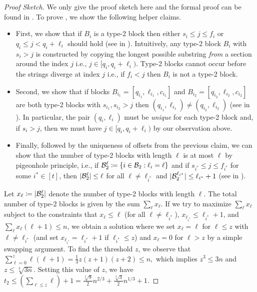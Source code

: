 \begin{proof}[Proof Sketch]
We only give the proof sketch here and the formal proof can be found in . To prove , we show the following helper claims. 
\begin{itemize}
    \item First, we show that if $B_i$ is a type-2 block then either $s_i\leq j\leq f_i$ or $q_i\leq j<q_i+\ell_i$ should hold (see  in ). Intuitively, any type-2 block $B_i$ with $s_i > j$ is constructed by copying the longest possible substring \emph{from} a section around the index $j$ i.e., $j \in [q_i, q_i+\ell_i)$. Type-2 blocks cannot occur before the strings diverge at index $j$ i.e., if $f_i < j$ then $B_i$ is not a type-2 block.
    \item Second, we show that if blocks $B_{i_1} = [q_{i_1}, \ell_{i_1}, c_{i_1}]$ and $B_{i_2}= [q_{i_2}, \ell_{i_2}, c_{i_2}]$ are both type-2 blocks with $s_{i_1}, s_{i_2} > j$ then $(q_{i_1},\ell_{i_1})\neq(q_{i_2},\ell_{i_2})$ (see  in ).  In particular, the pair $(q_i,\ell_i)$ must be {\em unique} for each type-2 block and, if $s_i > j$, then we must have $j \in [q_i, q_i+\ell_i)$ by our observation above.
    
    \item Finally, followed by the uniqueness of offsets from the previous claim, we can show that the number of type-2 blocks with length $\ell$ is at most $\ell$ by pigeonhole principle, i.e., if ${\mathcal{B}}_2^\ell\coloneqq\{i\in{\ensuremath{\mathcal{B}}}_2:\ell_i=\ell\}$ and if $s_{i^*}\leq j\leq f_{i^*}$ for some $i^*\in[t]$, then $|{\mathcal{B}}_2^\ell|\leq\ell$ for all $\ell\neq\ell_{i^*}$ and $|{\mathcal{B}}_2^{\ell_{i^*}}|\leq\ell_{i^*}+1$ (see  in ).
\end{itemize}
Let $x_\ell \coloneqq |{\mathcal{B}}_2^\ell|$ denote the number of type-2 blocks with length $\ell$. The total number of type-2 blocks is given by the sum $\sum_\ell x_{\ell}$. If we try to maximize $\sum_\ell x_{\ell}$ subject to the constraints that $x_\ell \leq \ell$ (for all $\ell\neq\ell_{i^*}$), $x_{\ell_{i^*}}\leq \ell_{i^*}+1$, and $\sum_\ell x_\ell  (\ell+1) \leq n$,  we obtain a solution where we set $x_\ell = \ell$ for $\ell \leq z$ with $\ell\neq \ell_{i^*}$ (and set $x_{\ell_{i^*}}=\ell_{i^*}+1$ if $\ell_{i^*}\leq z$) and $x_\ell = 0$ for $\ell > z$ by a simple swapping argument.
To find the threshold $z$, we observe that $\sum_{\ell=0}^z \ell(\ell+1) = \frac{1}{3}z(z+1)(z+2)\leq n,$
which implies $z^3\leq 3n$ and $z\leq\sqrt[3]{3n}$. Setting this value of $z$, we have $t_2 \leq \left(\sum_{\ell \leq z} \ell\right)+1 =  \frac{\sqrt[3]{9}}{2} n^{2/3} + \frac{\sqrt[3]{3}}{2} n^{1/3} + 1$.
\end{proof}

